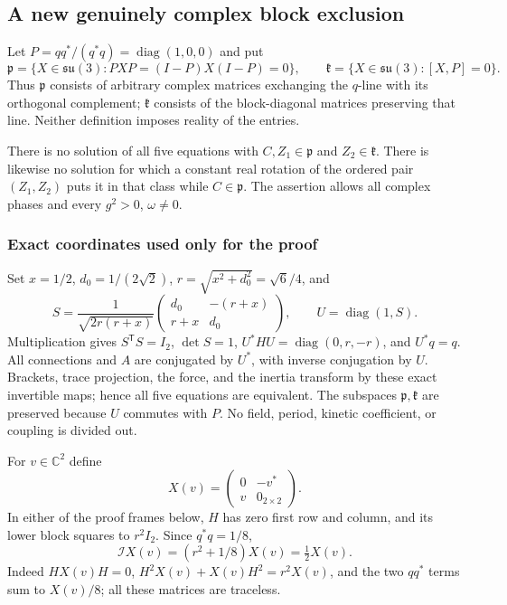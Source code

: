 \subsection{A new genuinely complex block exclusion}

Let $P=q q^*/(q^*q)=\operatorname{diag}(1,0,0)$ and put
\[
 \mathfrak p=\{X\in\mathfrak{su}(3):PXP=(I-P)X(I-P)=0\},\qquad
 \mathfrak k=\{X\in\mathfrak{su}(3):[X,P]=0\}.
\]
Thus $\mathfrak p$ consists of arbitrary complex matrices exchanging
the $q$-line with its orthogonal complement; $\mathfrak k$ consists of
the block-diagonal matrices preserving that line. Neither definition
imposes reality of the entries.

\begin{theorem}\label{q444:cx:thm:block}
There is no solution of all five equations with
$C,Z_1\in\mathfrak p$ and $Z_2\in\mathfrak k$.
There is likewise no solution for which a constant real rotation of
the ordered pair $(Z_1,Z_2)$ puts it in that class while
$C\in\mathfrak p$.
The assertion allows all complex phases and every $g^2>0$, $\omega\ne0$.
\end{theorem}

\subsubsection*{Exact coordinates used only for the proof}
Set $x=1/2$, $d_0=1/(2\sqrt2)$, $r=\sqrt{x^2+d_0^2}=\sqrt6/4$, and
\[
 S=\frac1{\sqrt{2r(r+x)}}
       \begin{pmatrix}d_0&-(r+x)\\r+x&d_0\end{pmatrix},
 \qquad U=\operatorname{diag}(1,S).
\]
Multiplication gives $S^{\mathsf T}S=I_2$, $\det S=1$,
$U^*HU=\operatorname{diag}(0,r,-r)$, and $U^*q=q$.
All connections and $A$ are conjugated by $U^*$, with inverse
conjugation by $U$. Brackets, trace projection, the force, and the
inertia transform by these exact invertible maps; hence all five
equations are equivalent. The subspaces $\mathfrak p,\mathfrak k$
are preserved because $U$ commutes with $P$.
No field, period, kinetic coefficient, or coupling is divided out.

For $v\in\mathbb C^2$ define
\[
 X(v)=\begin{pmatrix}0&-v^*\\v&0_{2\times2}\end{pmatrix}.
\]
In either of the proof frames below, $H$ has zero first row and column,
and its lower block squares to $r^2I_2$. Since $q^*q=1/8$,
\begin{equation}\label{q444:cx:eq:cross-inertia}
 \mathcal IX(v)=(r^2+1/8)X(v)=\tfrac12X(v).
\end{equation}
Indeed $HX(v)H=0$, $H^2X(v)+X(v)H^2=r^2X(v)$, and the two
$qq^*$ terms sum to $X(v)/8$; all these matrices are traceless.

